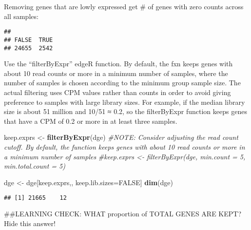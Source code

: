 \documentclass[
]{article}
\newenvironment{Shaded}{\begin{snugshade}}{\end{snugshade}}
\newcommand{\CommentTok}[1]{\textcolor[rgb]{0.56,0.35,0.01}{\textit{#1}}}
\newcommand{\DecValTok}[1]{\textcolor[rgb]{0.00,0.00,0.81}{#1}}
\newcommand{\KeywordTok}[1]{\textcolor[rgb]{0.13,0.29,0.53}{\textbf{#1}}}
\newcommand{\NormalTok}[1]{#1}
\newcommand{\OperatorTok}[1]{\textcolor[rgb]{0.81,0.36,0.00}{\textbf{#1}}}
\newcommand{\OtherTok}[1]{\textcolor[rgb]{0.56,0.35,0.01}{#1}}
\newcommand{\StringTok}[1]{\textcolor[rgb]{0.31,0.60,0.02}{#1}}
\begin{document}
Removing genes that are lowly expressed get \# of genes with zero counts
across all samples:

\begin{Shaded}
\end{Shaded}

\begin{verbatim}
## 
## FALSE  TRUE 
## 24655  2542
\end{verbatim}

Use the ``filterByExpr'' edgeR function. By default, the fxn keeps genes
with about 10 read counts or more in a minimum number of samples, where
the number of samples is chosen according to the minimum group sample
size. The actual filtering uses CPM values rather than counts in order
to avoid giving preference to samples with large library sizes. For
example, if the median library size is about 51 million and 10/51 ≈ 0.2,
so the filterByExpr function keeps genes that have a CPM of 0.2 or more
in at least three samples.

\begin{Shaded}
\begin{Highlighting}[]
\NormalTok{keep.exprs <-}\StringTok{ }\KeywordTok{filterByExpr}\NormalTok{(dge)}
\CommentTok{#NOTE: Consider adjusting the read count cutoff. By default, the function keeps genes with about 10 read counts or more in a minimum number of samples }
\CommentTok{#keep.exprs <- filterByExpr(dge, min.count = 5, min.total.count = 5)}

\NormalTok{dge <-}\StringTok{ }\NormalTok{dge[keep.exprs,, keep.lib.sizes=}\OtherTok{FALSE}\NormalTok{]}
\KeywordTok{dim}\NormalTok{(dge)}
\end{Highlighting}
\end{Shaded}

\begin{verbatim}
## [1] 21665    12
\end{verbatim}

\#\#LEARNING CHECK: WHAT proportion of TOTAL GENES ARE KEPT? Hide this
answer!

\begin{Shaded}
\end{Shaded}
\end{document}
